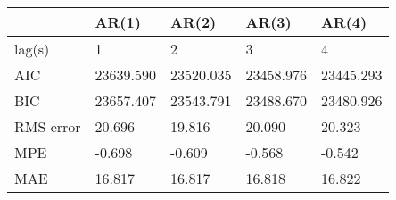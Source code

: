 \begin{tabular}{lllll}
\toprule
{} &      AR(1) &      AR(2) &      AR(3) &      AR(4) \\
\midrule
lag(s)    &          1 &          2 &          3 &          4 \\
AIC       &  23639.590 &  23520.035 &  23458.976 &  23445.293 \\
BIC       &  23657.407 &  23543.791 &  23488.670 &  23480.926 \\
RMS error &     20.696 &     19.816 &     20.090 &     20.323 \\
MPE       &     -0.698 &     -0.609 &     -0.568 &     -0.542 \\
MAE       &     16.817 &     16.817 &     16.818 &     16.822 \\
\bottomrule
\end{tabular}
